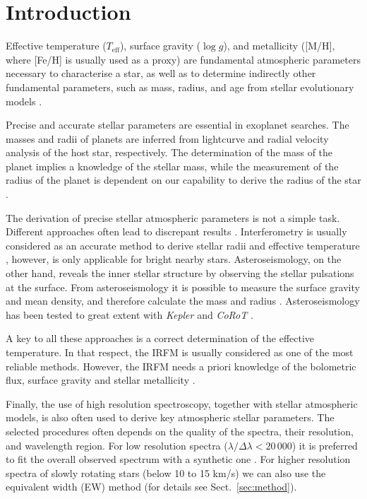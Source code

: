 \documentclass{aa}
\begin{document}
\section{Introduction}
\label{sec:introduction}

Effective temperature ($T_\mathrm{eff}$), surface gravity ($\log g$),
and metallicity ([M/H], where [Fe/H] is usually used as a proxy)
are fundamental atmospheric parameters necessary to characterise a
star, as well as to determine indirectly other fundamental parameters,
such as mass, radius, and age from stellar evolutionary models
\citep[e.g.][]{Girardi2000}.

Precise and accurate stellar parameters are essential in
exoplanet searches. The masses and radii of planets are inferred
from lightcurve and radial velocity analysis of the host star,
respectively. The
determination of the mass of the planet implies a knowledge of the
stellar mass, while the measurement of the radius of the planet
is dependent on our capability to derive the radius of the star
\citep{Ammler2009,Torres2008,Torres2012}.

The derivation of precise stellar atmospheric parameters is not a
simple task. Different approaches often lead to discrepant results
\citep[see e.g.][]{Santos13}. Interferometry is usually considered as an
accurate method to derive stellar radii and effective temperature
\citep[e.g.][]{Boyajian2012},
however, is only applicable for bright nearby stars. Asteroseismology,
on the other hand, reveals the inner stellar structure by observing
the stellar pulsations at the surface. From asteroseismology it is possible
to measure the surface gravity and mean density, and therefore calculate the
mass and radius \citep[e.g.][]{Kjeldsen1995}. Asteroseismology has
been tested to great extent with \emph{Kepler} and \emph{CoRoT}
\citep{Michel2008,Huber2011,Huber2012}.

A key to all these approaches is a correct determination
of the effective temperature. In that respect, the IRFM
is usually considered as one of the most reliable methods. However, the IRFM
needs a priori knowledge of the bolometric flux, surface gravity and
stellar metallicity \citep{Blackwell1977,Ramirez2005b,Casagrande2010}.

Finally, the use of high resolution spectroscopy, together with stellar
atmospheric models, is also often used to derive key atmospheric stellar
parameters. The selected procedures often depends on the quality of the
spectra, their resolution, and wavelength region. For low resolution
spectra ($\lambda/\Delta\lambda < 20\,000$) it is preferred to
fit the overall observed spectrum with a synthetic one \citep[see
e.g.][]{Recio2006}. For higher resolution spectra of slowly rotating
stars (below 10 to 15 \si{km/s}) we can also use the equivalent width (EW)
method (for details see Sect.~\ref{sec:method}).
\end{document}
